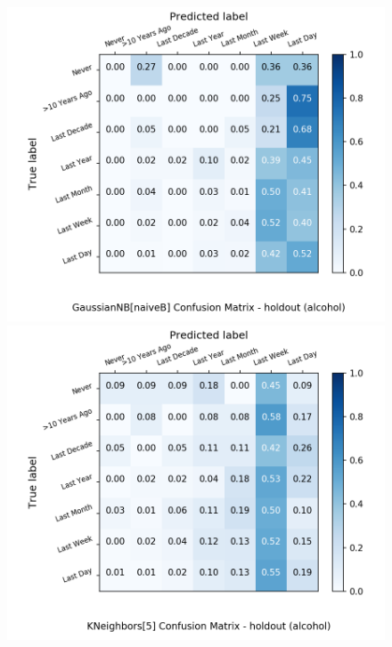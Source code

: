 \documentclass{article}
\begin{document}
\begin{figure}[h!]
	\begin{minipage}[b]{0.32\textwidth}
		\includegraphics[width=1.1\textwidth]{Plots/drugs/alcohol_GaussianNB_naiveB_balance_False_holdout.png}
	\end{minipage}
	\begin{minipage}[b]{0.32\textwidth}
		\includegraphics[width=1.1\textwidth]{Plots/drugs/alcohol_KNeighbors_5_balance_False_holdout.png}
  \end{minipage}
	\begin{minipage}[b]{0.32\textwidth}

\end{minipage}
\end{figure}
\end{document}

